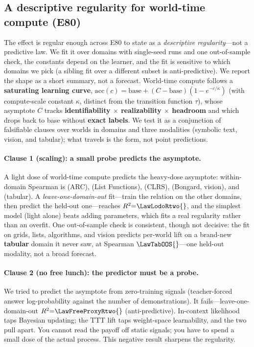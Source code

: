 \documentclass[11pt]{article}
\begin{document}
\subsection{A descriptive regularity for world-time compute (E80)}\label{sec:world-time-law}
The effect is regular enough across E80 to state as a \emph{descriptive regularity}---not a
predictive law. We fit it over \LawNDomains{} domains with single-seed runs and one
out-of-sample check, the constants depend on the learner, and the fit is sensitive to which
domains we pick (a sibling fit over a different subset is anti-predictive). We report the shape
as a short summary, not a forecast. World-time compute follows a
\textbf{saturating learning curve}, $\mathrm{acc}(c)=\mathrm{base}+(C-\mathrm{base})(1-e^{-c/\kappa})$
(with compute-scale constant $\kappa$, distinct from the transition function $\tau$),
whose asymptote $C$ tracks \textbf{identifiability $\times$ realizability $\times$ headroom}
and which drops back to base without \textbf{exact labels}. We test it as a conjunction of
falsifiable clauses over \LawNWorlds{} worlds in \LawNDomains{} domains and three modalities
(symbolic text, vision, and tabular); what travels is the form, not point predictions.

\paragraph{Clause 1 (scaling): a small probe predicts the asymptote.} A light dose
of world-time compute predicts the heavy-dose asymptote: within-domain Spearman is \LawWithinArc{}
(ARC), \LawWithinListfn{} (List Functions), \LawWithinClrs{} (CLRS), \LawWithinBongard{}
(Bongard, vision), and \LawWithinTabular{} (tabular). A \emph{leave-one-domain-out} fit---train
the relation on the other domains, then predict the held-out one---reaches $R^2{=}\LawLodoRtwo{}$, and
the simplest model (light alone) beats adding parameters, which fits a real
regularity rather than an overfit. One out-of-sample check is consistent, though not decisive: the fit on grids, lists,
algorithms, and vision predicts per-world lift on a brand-new \textbf{tabular} domain it never
saw, at Spearman $\LawTabOOS{}$---one held-out modality, not a broad forecast.

\paragraph{Clause 2 (no free lunch): the predictor must be a probe.} We tried to predict the
asymptote from zero-training signals (teacher-forced answer log-probability against the number of
demonstrations). It fails---leave-one-domain-out $R^2{=}\LawFreeProxyRtwo{}$ (anti-predictive).
In-context likelihood taps Bayesian updating; the TTT lift taps weight-space learnability, and
the two pull apart. You cannot read the payoff off static signals; you have to spend a small dose of the
actual process. This negative result sharpens the regularity.
\end{document}
